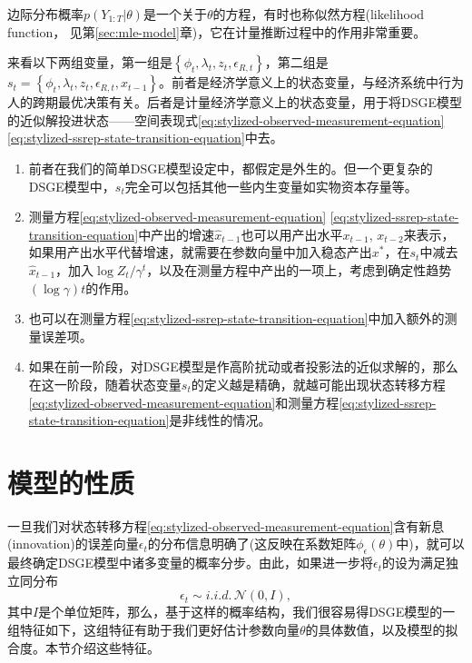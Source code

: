 边际分布概率$p \left( Y_{1:T} | \theta \right)$是一个关于$\theta$的方程，有时也称似然方程(likelihood function， 见第\ref{sec:mle-model}章)，它在计量推断过程中的作用非常重要。

\begin{remark}[``状态"变量]
  来看以下两组变量，第一组是$\left\{ \phi_{t}, \lambda_{t}, z_{t}, \epsilon_{R,t} \right\}$，第二组是$s_{t} = \left\{ \phi_{t}, \lambda_{t}, z_{t}, \epsilon_{R,t}, \hat{x}_{t-1} \right\}$。前者是经济学意义上的状态变量，与经济系统中行为人的跨期最优决策有关。后者是计量经济学意义上的状态变量，用于将DSGE模型的近似解投进状态——空间表现式\eqref{eq:stylized-observed-measurement-equation} \eqref{eq:stylized-ssrep-state-transition-equation}中去。

  \begin{enumerate}
    \item 前者在我们的简单DSGE模型设定中，都假定是外生的。但一个更复杂的DSGE模型中，$s_{t}$完全可以包括其他一些内生变量如实物资本存量等。
    \item 测量方程\eqref{eq:stylized-observed-measurement-equation} \eqref{eq:stylized-ssrep-state-transition-equation}中产出的增速$\hat{x}_{t-1}$也可以用产出水平$x_{t-1}, \, x_{t-2}$来表示，如果用产出水平代替增速，就需要在参数向量中加入稳态产出$x^{*}$，在$s_{t}$中减去$\hat{x}_{t-1}$，加入$\log Z_{t}/\gamma^{t}$，以及在测量方程中产出的一项上，考虑到确定性趋势$\left( \log \gamma \right) t$的作用。
    \item 也可以在测量方程\eqref{eq:stylized-ssrep-state-transition-equation}中加入额外的测量误差项。
    \item 如果在前一阶段，对DSGE模型是作高阶扰动或者投影法的近似求解的，那么在这一阶段，随着状态变量$s_{t}$的定义越是精确，就越可能出现状态转移方程\eqref{eq:stylized-observed-measurement-equation}和测量方程\eqref{eq:stylized-ssrep-state-transition-equation}是非线性的情况。
  \end{enumerate}
\end{remark}

\section{模型的性质}
\label{sec:stylized-model-implications}
一旦我们对状态转移方程\eqref{eq:stylized-observed-measurement-equation}含有新息(innovation)的误差向量$\epsilon_{t}$的分布信息明确了(这反映在系数矩阵$\phi_{\epsilon} \left( \theta \right)$中)，就可以最终确定DSGE模型中诸多变量的概率分步。由此，如果进一步将$\epsilon_{t}$的设为满足独立同分布
\begin{equation*}
  \epsilon_{t} \sim i.i.d. \, \mathcal{N} \left(0, I \right),
\end{equation*}
其中$I$是个单位矩阵，那么，基于这样的概率结构，我们很容易得DSGE模型的一组特征如下，这组特征有助于我们更好估计参数向量$\theta$的具体数值，以及模型的拟合度。本节介绍这些特征。

